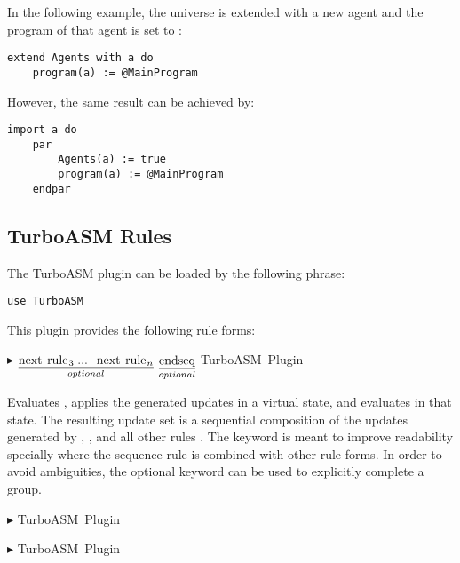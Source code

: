 \documentclass{article}
\newcommand{\ruleform}[2]{\pform{$\blacktriangleright$}{#1}{#2}}
\newcommand{\pform}[3]{\vspace*{4mm} \noindent #1 #2 \vspace{1mm}\textcolor[gray]{0.7}{\dotfill}\mbox{{\sffamily \footnotesize #3}}}
\newcommand{\optional}[1]{$\underset{optional}{\underline{\mbox{#1}}}$}
\begin{document}
In the following example, the universe  is extended with a new agent and 
the program of that agent is set to :

\begin{lstlisting}
extend Agents with a do
	program(a) := @MainProgram
\end{lstlisting}

\noindent However, the same result can be achieved by:

\begin{lstlisting}
import a do
	par
		Agents(a) := true
		program(a) := @MainProgram
	endpar
\end{lstlisting}

\subsection{TurboASM Rules}
\label{turboasm}

The TurboASM plugin can be loaded by the following  phrase:

\begin{lstlisting}
use TurboASM
\end{lstlisting}

\noindent This plugin provides the following rule forms:

\ruleform{
	\optional{\asm{next rule$_3$ ... next rule$_n$}}
	\optional{\asm{endseq}}
}{TurboASM Plugin}

Evaluates , applies the generated updates in a virtual state, and evaluates  in that state. 
The resulting update set is a sequential composition of the updates generated by , , and all other rules . 
The keyword  is meant to improve readability specially where the sequence rule is combined with other rule forms. In order to avoid ambiguities, the optional keyword  can be used to explicitly complete a  group.

\ruleform{
}{TurboASM Plugin}

\ruleform{
}{TurboASM Plugin}
\end{document}
